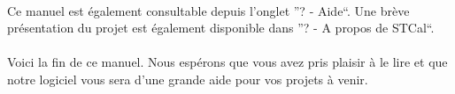 \documentclass[a4paper,10pt]{report}
\begin{document}
	\paragraph{}
	  Ce manuel est également consultable depuis l'onglet ''? - Aide``.
	  Une brève présentation du projet est également disponible dans ''? - A propos de STCal``.
	

	\paragraph{}
	  Voici la fin de ce manuel.
	  Nous espérons que vous avez pris plaisir à le lire et que notre logiciel vous sera d'une grande aide pour vos projets à venir.
\end{document}
